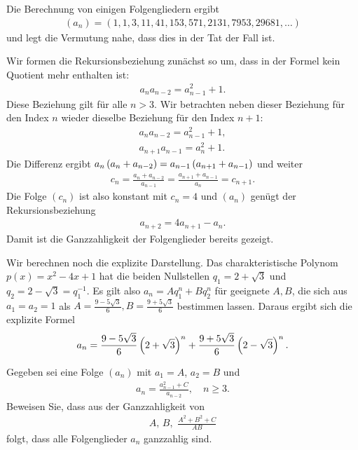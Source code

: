 \documentclass[11pt,a4paper]{article}
\begin{document}
\begin{loesung}
Die Berechnung von einigen Folgengliedern ergibt
\begin{gather*}
  (a_n)=(1, 1, 3, 11, 41, 153, 571, 2131, 7953, 29681, \dots)
\end{gather*}
und legt die Vermutung nahe, dass dies in der Tat der Fall ist.

Wir formen die Rekursionsbeziehung zunächst so um, dass in der Formel kein
Quotient mehr enthalten ist:
\begin{gather*}
    a_na_{n-2}=a_{n-1}^2+1.
\end{gather*}
Diese Beziehung gilt für alle $n>3$. Wir betrachten neben dieser Beziehung für
den Index $n$ wieder dieselbe Beziehung für den Index $n+1$:
\begin{gather*}
  a_na_{n-2}=a_{n-1}^2+1,\\ a_{n+1}a_{n-1}=a_n^2+1.
\end{gather*}
Die Differenz ergibt $a_n\left(a_n+a_{n-2}\right)=a_{n-1}\left(a_{n+1}+a_{n-1}\right)$ und
weiter 
\begin{gather*}
  c_n=\frac{a_n+a_{n-2}}{a_{n-1}}=\frac{a_{n+1}+a_{n-1}}{a_n}=c_{n+1}.
\end{gather*}
Die Folge $(c_n)$ ist also konstant mit $c_n=4$ und $(a_n)$ genügt der
Rekursionsbeziehung 
\begin{gather*}
  a_{n+2}=4a_{n+1}-a_n.
\end{gather*}
Damit ist die Ganzzahligkeit der Folgenglieder bereits gezeigt.
\end{loesung}

Wir berechnen noch die explizite Darstellung.  Das charakteristische Polynom
$p(x)=x^2-4x+1$ hat die beiden Nullstellen $q_1=2+\sqrt{3}$ und
$q_2=2-\sqrt{3}=q_1^{-1}$.  Es gilt also $a_n=Aq_1^n+Bq_2^n$ für geeignete
$A,B$, die sich aus $a_1=a_2=1$ als $A=\frac{9-5\sqrt3}{6},
B=\frac{9+5\sqrt3}{6}$ bestimmen lassen.  Daraus ergibt sich die explizite
Formel
\begin{gather*}
  a_n=\frac{9-5\sqrt3}{6}\left(2+\sqrt3\right)^n +\dfrac{9+5\sqrt3}{6}\left(2-\sqrt3\right)^n.
\end{gather*}

\begin{aufgabe}\label{r-2}
  Gegeben sei eine Folge $(a_n)$ mit $a_1=A$, $a_2=B$ und
\begin{gather*}
  a_n=\frac{a_{n-1}^2 +C}{a_{n-2}},\quad n\ge 3.
\end{gather*}
Beweisen Sie, dass aus der Ganzzahligkeit von
\begin{gather*}
  A, \, B,\,\,\frac{A^2 +B^2 +C}{AB}
\end{gather*}
folgt, dass alle Folgenglieder $a_n$ ganzzahlig sind.
\end{aufgabe}
\end{document}
